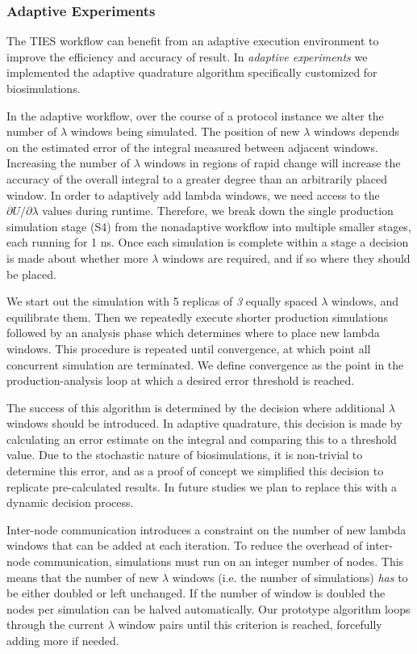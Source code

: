 
\subsubsection{Adaptive Experiments}

The TIES workflow can benefit from an adaptive execution environment to improve
the efficiency and accuracy of result. In \emph{adaptive experiments} we
implemented the adaptive quadrature algorithm specifically customized for
biosimulations.

In the adaptive workflow, over the course of a protocol instance we alter
the number of $\lambda$ windows being simulated. The position of new $\lambda$
windows depends on the estimated error of the integral measured between
adjacent windows. Increasing the number of $\lambda$ windows in regions of
rapid change will increase the accuracy of the overall integral to a greater
degree than an
arbitrarily placed window. In order to adaptively add lambda windows, we need
access to the $\partial U/\partial\lambda$ values during runtime. Therefore, 
we break down the single production simulation stage (S4) from the nonadaptive 
workflow into multiple smaller stages, each running for 1 ns. Once each 
simulation is complete within a stage a decision is made about whether more 
$\lambda$ windows are required, and if so where they should be placed.

We start out the simulation with 5 replicas of \emph{3} equally spaced
$\lambda$ windows, and equilibrate them.
Then we repeatedly execute
shorter production simulations followed by an analysis phase which determines 
where to place new lambda windows.
This procedure is repeated until convergence, at which point all
concurrent simulation are terminated.
We define convergence as the point in
the production-analysis loop at which a desired error threshold is
reached.

The success of this algorithm is determined by the decision
where additional $\lambda$ windows should be introduced.
In adaptive quadrature, this decision is made by
calculating an error estimate on the integral and comparing this to a threshold 
value. Due to the stochastic nature of biosimulations, it is
non-trivial to determine this error, and as a proof of concept we simplified
this decision to replicate pre-calculated results. In future studies we plan
to replace this with a dynamic decision process.

Inter-node communication introduces a constraint on the number of new lambda 
windows that can be added at each iteration. To reduce the overhead of 
inter-node communication, simulations must run on an integer number of nodes. 
This means that the number of new $\lambda$ windows (i.e. the number of 
simulations) \emph{has} to be either doubled or left unchanged.
If the number of window is doubled the nodes per simulation can be halved 
automatically. Our prototype algorithm loops through the current $\lambda$ 
window pairs until this criterion is reached, forcefully adding more if needed.


